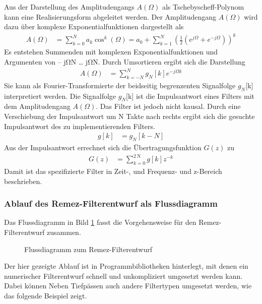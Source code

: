 Aus der Darstellung des Amplitudengangs \(A(Ω)\) als Tschebyscheff-Polynom kann eine Realisierungsform abgeleitet werden. Der Amplitudengang \(A(Ω)\) wird dazu über komplexe Exponentialfunktionen dargestellt als
\begin{align}
A(\Omega) &= \sum\limits_{k = 0}^{N}{a_{k}  \cos^{k}(\Omega)} = a_{0} + \sum\limits_{k = 1}^{N}\left( \frac{1}{2}  \left( e^{j  \Omega} + e^{- j  \Omega} \right) \right)^{k} \label{eq:9.153}
\end{align}
Es entstehen Summenden mit komplexen Exponentialfunktionen und Argumenten von -- jΩN \ldots{} jΩN. Durch Umsortieren ergibt sich die Darstellung
\begin{align}
A(\Omega) &= \sum\limits_{k = - N}^{N}{g_{N}[ k]  e^{- j  \Omega  k}} \label{eq:9.154}
\end{align}
Sie kann als Fourier-Transformierte der beidseitig begrenzenten Signalfolge \(g_{N}\){[}k{]} interpretiert werden. Die Signalfolge \(g_{N}\){[}k{]} ist die Impulsantwort eines Filters mit dem Amplitudengang \(A(Ω)\). Das Filter ist jedoch nicht kausal. Durch eine Verschiebung der Impulsantwort um N Takte nach rechts ergibt sich die gesuchte Impulsantwort des zu implementierenden Filters.
\begin{align}
g[ k] &= g_{N}[ k - N] \label{eq:9.155}
\end{align}
Aus der Impulsantwort errechnet sich die Übertragungsfunktion \(G(z)\) zu
\begin{align}
G(z) &= \sum\limits_{k = 0}^{\qty{2}{\newton}}{g[ k]  z^{- k}} \label{eq:9.156}
\end{align}
Damit ist das spezifizierte Filter in Zeit-, und Frequenz- und z-Bereich beschrieben.

\subsubsection{Ablauf des Remez-Filterentwurf als Flussdiagramm}\label{sec:ablauf-des-remez-filterentwurf-als-flussdiagramm}

Das Flussdiagramm in Bild \ref{fig:9.42} fasst die Vorgehensweise für den Remez-Filterentwurf zusammen.

\begin{figure}
  \centering
  
  \caption{Flussdiagramm zum Remez-Filterentwurf}
  \label{fig:9.42}
\end{figure}

Der hier gezeigte Ablauf ist in Programmbibliotheken hinterlegt, mit denen ein numerischer Filterentwurf schnell und unkompliziert umgesetzt werden kann. Dabei können Neben Tiefpässen auch andere Filtertypen umgesetzt werden, wie das folgende Beispiel zeigt.

